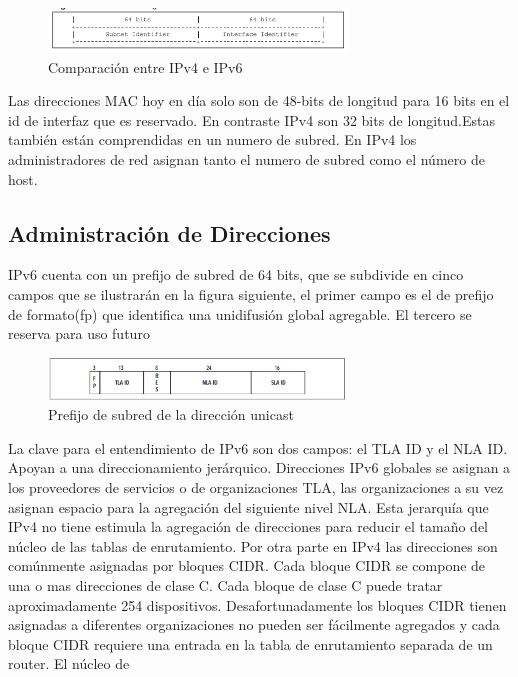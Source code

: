 \documentclass[11pt,a4paper]{article}
\begin{document}
\begin{figure}[h!]
 \centering
 \includegraphics[width=0.71\textwidth]{v6vsv4.png}
 \caption[Comparaciones]{Comparación entre IPv4 e IPv6}
\end{figure} \par

Las direcciones MAC hoy en día solo son de 48-bits de longitud para 16 bits en el id de interfaz que 
es reservado. En contraste IPv4 son 32 bits de longitud.Estas también están comprendidas en un 
numero de subred. En IPv4 los administradores de red asignan tanto el numero de subred como el 
número de host.
\subsection{Administración de Direcciones}
IPv6 cuenta con un prefijo de subred de 64 bits, que se subdivide en cinco campos que se ilustrarán 
en la figura siguiente, el primer campo es el de prefijo de formato(fp) que identifica una 
unidifusión global agregable. El tercero se reserva para uso futuro
\begin{figure}[h!]
 \centering
 \includegraphics[width=0.71\textwidth]{asign.png}
 \caption[Asignación de prefijo]{Prefijo de subred de la dirección unicast}
\end{figure} \par
La clave para el entendimiento de IPv6 son dos campos: el TLA ID y el NLA ID. Apoyan a una 
direccionamiento jerárquico. Direcciones IPv6 globales se asignan a los proveedores de servicios o de 
organizaciones TLA, las organizaciones a su vez asignan espacio para la agregación del siguiente 
nivel NLA. Esta jerarquía que IPv4 no tiene estimula la agregación de direcciones para reducir el 
tamaño del núcleo de las tablas de enrutamiento. Por otra parte en IPv4 las direcciones son 
comúnmente asignadas por bloques CIDR. Cada bloque CIDR se compone de una o mas direcciones de clase 
C. Cada bloque de clase C puede tratar aproximadamente 254 dispositivos. Desafortunadamente los 
bloques CIDR tienen asignadas a diferentes organizaciones no pueden ser fácilmente agregados y cada 
bloque CIDR requiere una entrada en la tabla de enrutamiento separada de un router. El núcleo de 
\end{document}
